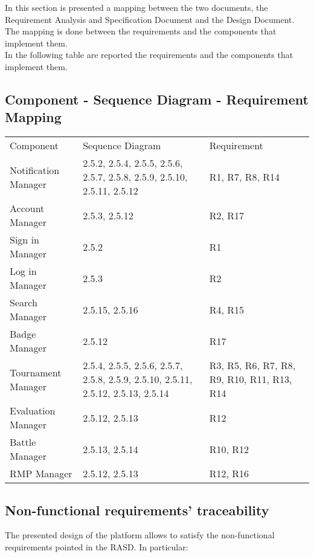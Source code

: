 In this section is presented a mapping between the two documents, the Requirement Analysis and Specification Document and the Design Document. The mapping is done between the requirements and the components that implement them.\\
In the following table are reported the requirements and the components that implement them.
\subsection{Component - Sequence Diagram - Requirement Mapping} \label{uc:mapping}
\begin{center}
    \begin{tabu}{|X[.25]|X[.4]|X[.2]|} \hline \everyrow{\hline}
        Component & Sequence Diagram & Requirement \\
        Notification Manager & 2.5.2, 2.5.4, 2.5.5, 2.5.6, 2.5.7, 2.5.8, 2.5.9, 2.5.10, 2.5.11, 2.5.12  & R1, R7, R8, R14\\ 
        Account Manager & 2.5.3, 2.5.12  & R2, R17\\
        Sign in Manager & 2.5.2 & R1\\
        Log in Manager & 2.5.3 & R2\\
        Search Manager & 2.5.15, 2.5.16& R4, R15\\
        Badge Manager & 2.5.12 & R17\\
        Tournament Manager & 2.5.4, 2.5.5, 2.5.6, 2.5.7, 2.5.8, 2.5.9, 2.5.10, 2.5.11, 2.5.12, 2.5.13, 2.5.14 & R3, R5, R6, R7, R8, R9, R10, R11, R13, R14\\
        Evaluation Manager & 2.5.12, 2.5.13 & R12\\
        Battle Manager & 2.5.13, 2.5.14 & R10, R12\\
        RMP Manager & 2.5.12, 2.5.13 & R12, R16\\
    \end{tabu}
\end{center}

\subsection{Non-functional requirements' traceability}
The presented design of the platform allows to satisfy the non-functional requirements pointed in the RASD. In particular:
